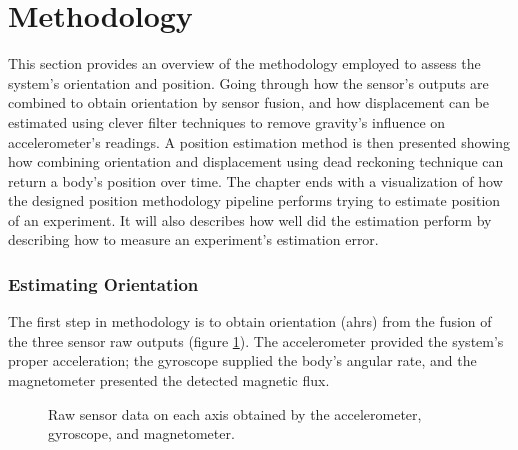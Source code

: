 \section{Methodology}
\label{sub:methodology}

This section provides an overview of the methodology employed to assess the system's orientation and position. Going through how the sensor's outputs are combined to obtain orientation by sensor fusion, and how displacement can be estimated using clever filter techniques to remove gravity's influence on accelerometer's readings. A position estimation method is then presented showing how combining orientation and displacement using dead reckoning technique can return a body's position over time. The chapter ends with a visualization of how the designed position methodology pipeline performs trying to estimate position of an experiment. It will also describes how well did the estimation perform by describing how to measure an experiment's estimation error.


\subsubsection{Estimating Orientation}

The first step in methodology is to obtain orientation (\acrshort{ahrs}) from the fusion of the three sensor raw outputs (figure \ref{fig:raw}). The accelerometer provided the system's proper acceleration; the gyroscope supplied the body's angular rate, and the magnetometer presented the detected magnetic flux.

\begin{figure}[!h]
    \centering
    \resizebox{0.75\linewidth}{!}{}
    \caption{Raw sensor data on each axis obtained by the accelerometer, gyroscope, and magnetometer.}
    \label{fig:raw}
\end{figure}

